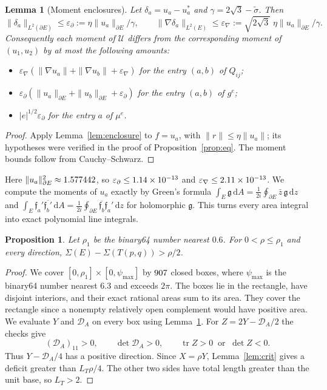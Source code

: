 \documentclass[11pt]{article}
\newtheorem{proposition}[theorem]{Proposition}
\newtheorem{lemma}[theorem]{Lemma}
\theoremstyle{definition}
\theoremstyle{remark}
\newcommand{\eps}{\varepsilon}
\newcommand{\dd}{\,\mathrm{d}}
\DeclareMathOperator{\tr}{tr}
\begin{document}
\begin{lemma}[Moment enclosures]\label{lem:moments}
Let $\delta_a=u_a-u^*_a$ and $\gamma=2\sqrt3-\tilde\sigma$. Then
\[\|\delta_a\|_{L^2(\partial E)}\le\eps_\partial:=\eta\|u_a\|_{\partial E}/\gamma,\qquad
\|\nabla\delta_a\|_{L^2(E)}\le\eps_\nabla:=\sqrt{2\sqrt3}\;\eta\|u_a\|_{\partial E}/\gamma .\]
Consequently each moment of $\mathcal U$ differs from the corresponding moment of $(u_1,u_2)$ by at most
the following amounts:
\begin{itemize}
\item $\eps_\nabla(\|\nabla u_a\|+\|\nabla u_b\|+\eps_\nabla)$ for the entry $(a,b)$ of $Q_{ij}$;
\item $\eps_\partial(\|u_a\|_{\partial E}+\|u_b\|_{\partial E}+\eps_\partial)$ for the entry $(a,b)$ of $g^e$;
\item $|e|^{1/2}\eps_\partial$ for the entry $a$ of $\mu^e$.
\end{itemize}
\end{lemma}
\begin{proof}
Apply Lemma~\ref{lem:enclosure} to $f=u_a$, with $\|r\|\le\eta\|u_a\|$; its hypotheses were verified in the
proof of Proposition~\ref{prop:eq}. The moment bounds follow from Cauchy--Schwarz.
\end{proof}

Here $\|u_a\|^2_{\partial E}\approx1.577442$, so $\eps_\partial\le\clepsBdryMax$ and
$\eps_\nabla\le\clepsGradMax$. We compute the moments of $u_a$ exactly by Green's formula
$\int_E\mathfrak g\dd A=\frac1{2i}\oint_{\partial E}\bar z\,\mathfrak g\dd z$ and
$\int_E\mathfrak f_a'\overline{\mathfrak f_b'}\dd A=\frac1{2i}\oint_{\partial E}\overline{\mathfrak f_b}\mathfrak f_a'\dd z$ for holomorphic $\mathfrak g$. This turns every area integral into exact
polynomial line integrals.

\begin{proposition}\label{prop:local}
Let $\rho_1$ be the binary64 number nearest $0.6$. For $0<\rho\le\rho_1$ and every direction,
$\Sigma(E)-\Sigma(T(p,q))>\rho/2$.
\end{proposition}
\begin{proof}
We cover $[0,\rho_1]\times[0,\psi_{\max}]$ by $907$ closed boxes, where
$\psi_{\max}$ is the binary64 number nearest $6.3$ and exceeds $2\pi$. The boxes lie in the rectangle,
have disjoint interiors, and their exact rational areas sum to its area. They cover the rectangle since
a nonempty relatively open complement would have positive area. We evaluate $Y$ and $\mathcal D_A$ on
every box using Lemma~\ref{lem:moments}. For $Z=2Y-\mathcal D_A/2$ the checks give
\[
(\mathcal D_A)_{11}>0,\qquad \det\mathcal D_A>0,\qquad \tr Z>0\ \text{ or }\ \det Z<0 .
\]
Thus $Y-\mathcal D_A/4$ has a positive direction. Since $X=\rho Y$, Lemma~\ref{lem:crit}
gives a deficit greater than $L_T\rho/4$. The other two sides have total length greater than the unit
base, so $L_T>2$.
\end{proof}
\end{document}
